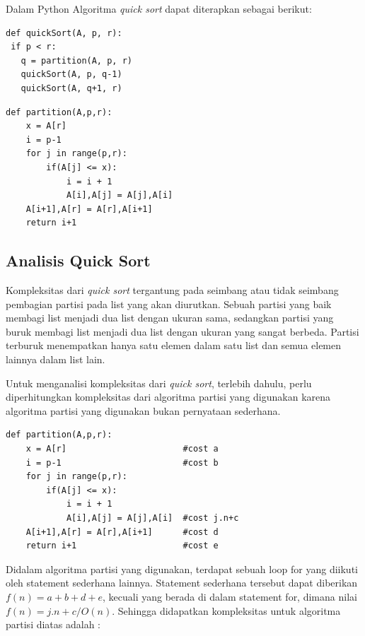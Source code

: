 \newpage{}
Dalam Python Algoritma \textit{quick sort} dapat diterapkan sebagai berikut:
\lstset{language=Python}
\label{lst:QuickSort}
\begin{lstlisting}[frame=single]
def quickSort(A, p, r):
 if p < r:
   q = partition(A, p, r)
   quickSort(A, p, q-1)
   quickSort(A, q+1, r)
\end{lstlisting}

\lstset{language=Python}
\label{lst:Partition}
\begin{lstlisting}[frame=single]
def partition(A,p,r):
    x = A[r]
    i = p-1
    for j in range(p,r):
        if(A[j] <= x):
            i = i + 1
            A[i],A[j] = A[j],A[i]
    A[i+1],A[r] = A[r],A[i+1]
    return i+1
\end{lstlisting}

\subsection{Analisis Quick Sort}
Kompleksitas dari \textit{quick sort} tergantung pada  seimbang atau tidak seimbang pembagian partisi pada list yang akan diurutkan. Sebuah partisi yang  baik membagi list menjadi dua list dengan ukuran sama, sedangkan partisi yang buruk membagi list menjadi dua list dengan ukuran yang sangat berbeda. Partisi terburuk menempatkan hanya satu elemen dalam satu list dan semua elemen lainnya dalam list lain. 

Untuk menganalisi kompleksitas dari \textit{quick sort}, terlebih dahulu, perlu diperhitungkan kompleksitas dari algoritma partisi yang digunakan karena algoritma partisi yang digunakan bukan pernyataan sederhana.

\lstset{language=Python}
\label{lst:Partition}
\begin{lstlisting}[frame=single]
def partition(A,p,r):
    x = A[r]                       #cost a
    i = p-1                        #cost b
    for j in range(p,r):
        if(A[j] <= x):
            i = i + 1
            A[i],A[j] = A[j],A[i]  #cost j.n+c
    A[i+1],A[r] = A[r],A[i+1]      #cost d
    return i+1                     #cost e
\end{lstlisting}

Didalam algoritma partisi yang digunakan, terdapat sebuah loop for yang diikuti oleh statement sederhana lainnya. Statement sederhana tersebut dapat diberikan $f(n)= a+b+d+e$, kecuali yang berada di dalam statement for, dimana nilai $f(n) = j.n+c/O(n)$. Sehingga didapatkan kompleksitas untuk algoritma partisi diatas adalah :

